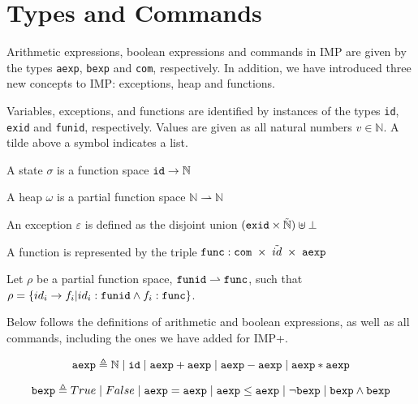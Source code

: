 \section{Types and Commands}

Arithmetic expressions, boolean expressions and commands in IMP are given by the types \verb|aexp|, \verb|bexp| and \verb|com|, respectively. In addition, we have introduced three new concepts to IMP: exceptions, heap and functions.

Variables, exceptions, and functions are identified by instances of the types \verb|id|, \verb|exid| and \verb|funid|, respectively. Values are given as all natural numbers $v\in\mathbb{N}$. A tilde above a symbol indicates a list.

A state $\sigma$ is a function space $\verb|id| \rightarrow \mathbb{N}$

A heap $\omega$ is a partial function space $\mathbb{N} \rightharpoonup \mathbb{N}$

An exception $\varepsilon$ is defined as the disjoint union $(\verb|exid|\times\tilde{\mathbb{N}})\uplus\bot$

A function is represented by the triple $\verb|func|: \verb|com| \; \times \; \tilde{id} \; \times \; \verb|aexp|$

Let $\rho$ be a partial function space, 
$\verb|funid| \rightharpoonup \verb|func|$, 
such that 
$\rho = \{ id_i \rightarrow f_i | id_i : \verb|funid| \wedge f_i:\verb|func| \}$.

Below follows the definitions of arithmetic and boolean expressions, as well as all commands, including the ones we have added for IMP+.

\begin{equation}
\verb|aexp| \triangleq \mathbb{N} \;|\; \verb|id| \;|\; \verb|aexp| + \verb|aexp| \;|\;  \verb|aexp| - \verb|aexp| \;|\;  \verb|aexp| * \verb|aexp|
\end{equation}

\begin{equation}
\verb|bexp| \triangleq True \;|\; False \;|\; \verb|aexp| = \verb|aexp| \;|\; \verb|aexp| \leq \verb|aexp| \;|\; \neg\verb|bexp| \;|\; \verb|bexp| \wedge \verb|bexp|
\end{equation}

